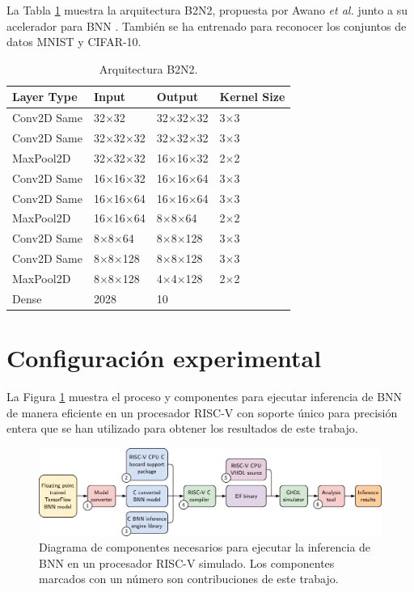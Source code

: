 La Tabla \ref{tab:b2n2_model} muestra la arquitectura B2N2, propuesta por Awano \emph{et al.} junto a su acelerador para BNN \cite{bnn_clt_approx}. También se ha entrenado para reconocer los conjuntos de datos MNIST y CIFAR-10.

\begin{table}[h]
	\centering
	\caption{Arquitectura B2N2.}
	\label{tab:b2n2_model}
	\begin{tabular}{llll}
	\hline
	\textbf{Layer Type} & \textbf{Input} & \textbf{Output} & \textbf{Kernel Size}\\ \hline
	Conv2D Same & 32$\times$32 & 32$\times$32$\times$32 & 3$\times$3 \\
	Conv2D Same & 32$\times$32$\times$32 & 32$\times$32$\times$32 & 3$\times$3 \\
	MaxPool2D & 32$\times$32$\times$32 & 16$\times$16$\times$32 & 2$\times$2 \\
	Conv2D Same & 16$\times$16$\times$32 & 16$\times$16$\times$64 & 3$\times$3 \\
	Conv2D Same & 16$\times$16$\times$64 & 16$\times$16$\times$64 & 3$\times$3 \\
	MaxPool2D & 16$\times$16$\times$64 & 8$\times$8$\times$64 & 2$\times$2 \\
	Conv2D Same & 8$\times$8$\times$64 & 8$\times$8$\times$128 & 3$\times$3 \\
	Conv2D Same & 8$\times$8$\times$128 & 8$\times$8$\times$128 & 3$\times$3 \\
	MaxPool2D & 8$\times$8$\times$128 & 4$\times$4$\times$128 & 2$\times$2 \\
	Dense & 2028 & 10 & \\ \hline
	\end{tabular}
\end{table}

\section{Configuración experimental}

La Figura \ref{fig:experiment_pipeline} muestra el proceso y componentes para ejecutar inferencia de BNN de manera eficiente en un procesador RISC-V con soporte único para precisión entera que se han utilizado para obtener los resultados de este trabajo.

\begin{figure}[h]
	\centering
	\includegraphics[width=\textwidth]{root/Imagenes/metodologia/experiment_pipeline.pdf}
	\caption{Diagrama de componentes necesarios para ejecutar la inferencia de BNN en un procesador RISC-V simulado. Los componentes marcados con un número son contribuciones de este trabajo.}
	\label{fig:experiment_pipeline}
\end{figure}

